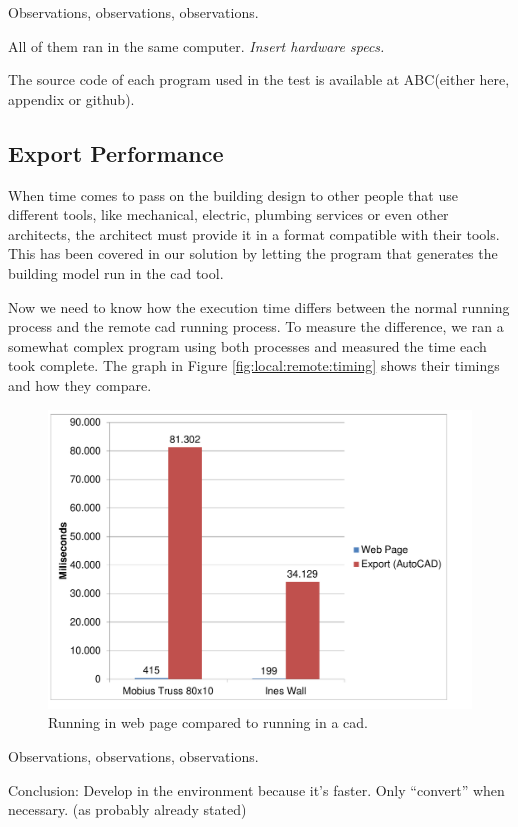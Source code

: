 Observations, observations, observations.

All of them ran in the same computer.
{\it Insert hardware specs.}

The source code of each program used in the test is available at ABC(either here, appendix or github).


\subsection{Export Performance}
When time comes to pass on the building design to other people that use different tools, like mechanical, electric, plumbing services or even other architects, the architect must provide it in a format compatible with their tools.
This has been covered in our solution by letting the program that generates the building model run in the \gls{cad} tool.

Now we need to know how the execution time differs between the normal running process and the remote \gls{cad} running process.
To measure the difference, we ran a somewhat complex program using both processes and measured the time each took complete.
The graph in Figure \ref{fig:local:remote:timing} shows their timings and how they compare.

\begin{figure}
  \centering
  \includegraphics[width=12cm]{./images/local_remote_timing}
  \caption{Running in web page compared to running in a \gls{cad}.}
  \label{fig:run:timing:chart}
\end{figure}

Observations, observations, observations.

Conclusion: Develop in the environment because it's faster. Only ``convert'' when necessary. (as probably already stated)



